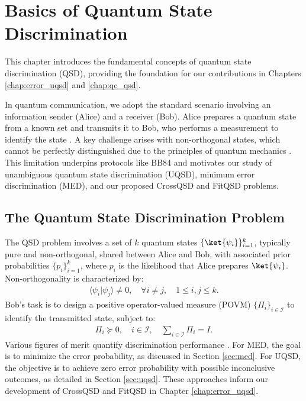 
\chapter{Basics of Quantum State Discrimination}
\label{chap:basics_qsd}

This chapter introduces the fundamental concepts of quantum state
discrimination (QSD), providing the foundation for our contributions in
Chapters \ref{chap:error_uqsd} and \ref{chap:qc_qsd}.

In quantum communication, we adopt the standard scenario involving an
information sender (Alice) and a receiver (Bob).
Alice prepares a quantum state from a known set and transmits it to Bob, who
performs a measurement to identify the state \cite{qcqi}.
A key challenge arises with non-orthogonal states, which cannot be perfectly
distinguished due to the principles of quantum mechanics \cite{qcqi}.
This limitation underpins protocols like BB84 and motivates our study of
unambiguous quantum state discrimination (UQSD), minimum error discrimination (MED),
and our proposed CrossQSD and FitQSD problems.

\section{The Quantum State Discrimination Problem}
\label{sec:qsd_problem}
The QSD problem involves a set of \(k\) quantum states \(\{ \ket{\psi_i} \}_{i=1}^k\),
typically pure and non-orthogonal, shared between Alice and Bob, with
associated prior probabilities \(\{ p_i \}_{i=1}^k\), where \(p_i\) is the
likelihood that Alice prepares \(\ket{\psi_i}\).
Non-orthogonality is characterized by:
\begin{align}
    \langle \psi_i | \psi_j \rangle \neq 0, \quad \forall i \neq j, \quad 1 \leq i, j \leq k. \label{eq:non_orthogonal}
\end{align}
Bob’s task is to design a positive operator-valued measure (POVM)
\(\{ \Pi_i \}_{i \in \mathcal{I}}\) to identify the transmitted state, subject to:
\begin{align}
    \Pi_i \succeq 0, \quad i \in \mathcal{I}, \quad \sum_{i \in \mathcal{I}} \Pi_i = I. \label{eq:povm_constraints}
\end{align}
Various figures of merit quantify discrimination performance \cite{RN65}.
For MED, the goal is to minimize the error probability, as discussed in Section \ref{sec:med}.
For UQSD, the objective is to achieve zero error probability with possible
inconclusive outcomes, as detailed in Section \ref{sec:uqsd}.
These approaches inform our development of CrossQSD and FitQSD in Chapter \ref{chap:error_uqsd}.

